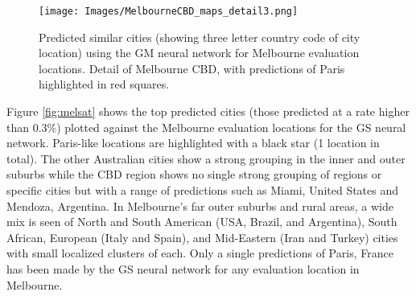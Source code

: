\documentclass[sageh,times]{sagej}
\begin{document}
\begin{figure}[!htbp]
\centering     
\texttt{[image: Images/MelbourneCBD\_maps\_detail3.png]} 
\caption{Predicted similar cities (showing three letter country code of city location) using the GM neural network for Melbourne evaluation locations. Detail of Melbourne CBD, with predictions of Paris highlighted in red squares.}    
 \label{fig:melmapscbd}  
\end{figure} 

Figure \ref{fig:melsat} shows the top predicted cities (those predicted at a rate higher than 0.3\%) plotted against the Melbourne evaluation locations for the GS neural network. Paris-like locations are highlighted with a black star (1 location in total).  The other Australian cities show a strong grouping in the inner and outer suburbs while the CBD region shows no single strong grouping of regions or specific cities but with a range of predictions such as Miami, United States and Mendoza, Argentina. In Melbourne's far outer suburbs and rural areas, a wide mix is seen of North and South American (USA, Brazil, and Argentina), South African, European (Italy and Spain), and Mid-Eastern (Iran and Turkey) cities with small localized clusters of each. Only a single predictions of Paris, France has been made by the GS neural network for any evaluation location in Melbourne.
\end{document}
